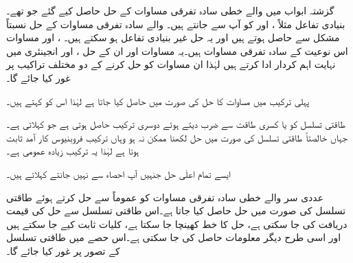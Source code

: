 گزشتہ ابواب میں  والے خطی سادہ تفرقی مساوات کے حل حاصل کیے گئے جو  تھے۔بنیادی تفاعل مثلاً ،  اور  کو آپ  سے جانتے ہیں۔ والے سادہ تفرقی مساوات کے حل نسبتاً مشکل سے حاصل ہوتے ہیں اور یہ حل غیر بنیادی تفاعل ہو سکتے ہیں۔ ،  اور  مساوات اس نوعیت کے سادہ تفرقی مساوات ہیں۔یہ مساوات اور ان کے حل ،  اور  انجینئری میں نہایت اہم کردار ادا کرتے ہیں لہٰذا ان مساوات کو حل کرنے کے دو مختلف تراکیب پر غور کیا جائے گا۔

پہلی ترکیب میں مساوات کا حل   کی صورت میں حاصل کیا جاتا ہے لہٰذا اس کو  کہتے ہیں۔

طاقتی تسلسل کو  یا کسری طاقت  سے ضرب دیتے ہوئے دوسری ترکیب حاصل ہوتی ہے جو  کہلاتی ہے۔جہاں خالصتاً طاقتی تسلسل کی صورت میں حل لکھنا ممکن نہ ہو وہاں ترکیب فروبنیوس کار آمد ثابت ہوتا ہے لہٰذا یہ ترکیب زیادہ عمومی ہے۔

ایسے تمام اعلٰی حل جنہیں آپ احصاء سے نہیں جانتے   کہلاتے ہیں۔

 عددی سر والے خطی سادہ تفرقی مساوات کو عموماً  سے حل کرتے ہوئے طاقتی تسلسل کی صورت میں حل حاصل کیا جاتا ہے۔اس طاقتی تسلسل سے حل کی قیمت دریافت کی جا سکتی ہے، حل کا خط کھینچا جا سکتا ہے، کلیات ثابت کیے جا سکتے ہیں اور اسی طرح دیگر معلومات حاصل کی جا سکتی ہے۔اس حصے میں طاقتی تسلسل کے تصور پر غور کیا جائے گا۔

